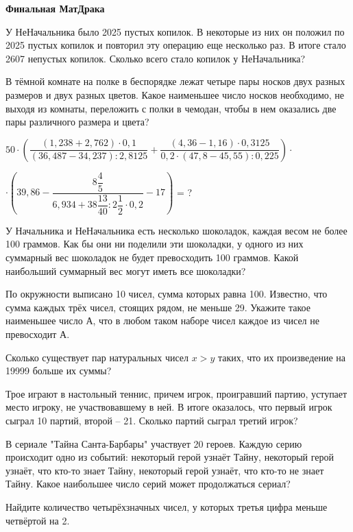 \centerline{\bf \Huge Финальная МатДрака}

 У НеНачальника было 2025 пустых копилок. В некоторые из них он положил по 2025 пустых копилок и повторил эту операцию еще несколько раз. В итоге стало 2607 непустых копилок.
Сколько всего стало копилок у НеНачальника?

 В тёмной комнате на полке в беспорядке лежат четыре пары носков двух разных размеров и двух разных цветов. Какое наименьшее число носков необходимо, не выходя из комнаты, переложить с полки в чемодан, чтобы в нем оказались две пары различного размера и цвета?

 $50\cdot(\dfrac{(1,238+2,762) \cdot 0,1}{(36,487-34,237): 2,8125}+\dfrac{(4,36-1,16) \cdot 0,3125}{0,2 \cdot(47,8-45,55): 0,225})\cdot$ 

$\cdot(39,86-\dfrac{8 \dfrac{4}{5}}{6,934+38 \dfrac{13}{40}: 2 \dfrac{1}{2} \cdot 0,2}-17)$ = ?

 У Начальника и НеНачальника есть несколько шоколадок, каждая весом не более 100 граммов. Как бы они ни поделили эти шоколадки, у одного из них суммарный вес шоколадок не будет превосходить 100 граммов. Какой наибольший суммарный вес могут иметь все шоколадки?

 По окружности выписано 10 чисел, сумма которых равна 100. Известно, что сумма каждых трёх чисел, стоящих рядом, не меньше 29.
Укажите такое наименьшее число А, что в любом таком наборе чисел каждое из чисел не превосходит А.

 Сколько существует пар натуральных чисел $x > y$ таких, что их
произведение на 19999 больше их суммы?


 Трое играют в настольный теннис, причем игрок, проигравший партию, уступает место игроку, не участвовавшему в ней. В итоге оказалось, что первый игрок сыграл 10 партий, второй – 21. Сколько партий сыграл третий игрок?

 В сериале "Тайна Санта-Барбары" участвует 20 героев. Каждую серию происходит одно из событий: некоторый герой узнаёт Тайну, некоторый герой узнаёт, что кто-то знает Тайну, некоторый герой узнаёт, что кто-то не знает Тайну. Какое наибольшее число серий может продолжаться сериал?

\newpage

\hspace{3mm}

 Найдите количество четырёхзначных чисел, у которых третья цифра
меньше четвёртой на 2.


